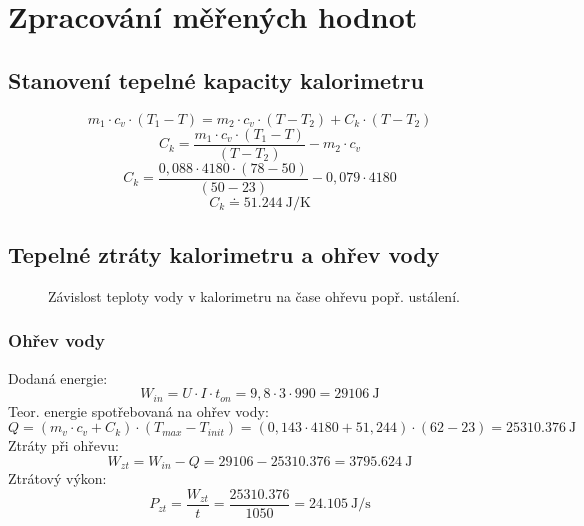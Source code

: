 \documentclass{protokol}
\begin{document}

\section{Zpracování měřených hodnot}
\subsection{Stanovení tepelné kapacity kalorimetru}

\[
	m_1 \cdot c_v \cdot\left(T_1-T\right)=m_2 \cdot c_v \cdot\left(T-T_2\right)+C_k \cdot\left(T-T_2\right)
\]
\[
	C_k=\frac{m_1 \cdot c_v \cdot\left(T_1-T\right)}{\left(T-T_2\right)}-m_2 \cdot c_v
\]
\[
	C_k=\frac{0,088 \cdot 4180 \cdot\left(78-50\right)}{\left(50-23\right)}-0,079 \cdot 4180
\]
\[
	C_{k} \doteq \qty{51,244}{\joule\per\kelvin}
\]

\subsection{Tepelné ztráty kalorimetru a ohřev vody}
\begin{figure*}[h!]
	\caption{Závislost teploty vody v kalorimetru na čase ohřevu popř. ustálení.}
\end{figure*}

\subsubsection{Ohřev vody}
Dodaná energie: 
 \[
	W_{in}=U\cdot I \cdot t_{on}  = 9,8\cdot 3\cdot 990 = \qty{29106}{\joule}
 \]
Teor. energie spotřebovaná na ohřev vody: 
 \[
	Q=(m_{v} \cdot c_{v}+C_{k} ) \cdot (T_{max}-T_{init}) = (0,143 \cdot 4180 + 51,244) \cdot (62-23) = \qty{25310.376}{\joule}
 \]
Ztráty při ohřevu: 
\[
	W_{zt} = W_{in} -Q= \num{29106}-\num{25310.376}=\qty{3795,624}{\joule}
\]
Ztrátový výkon: 
\[
	P_{zt} =  \frac{W_{zt}}{t}=\frac{25310.376}{1050}=\qty{24,105}{\joule\per\second}
\]
\end{document}

